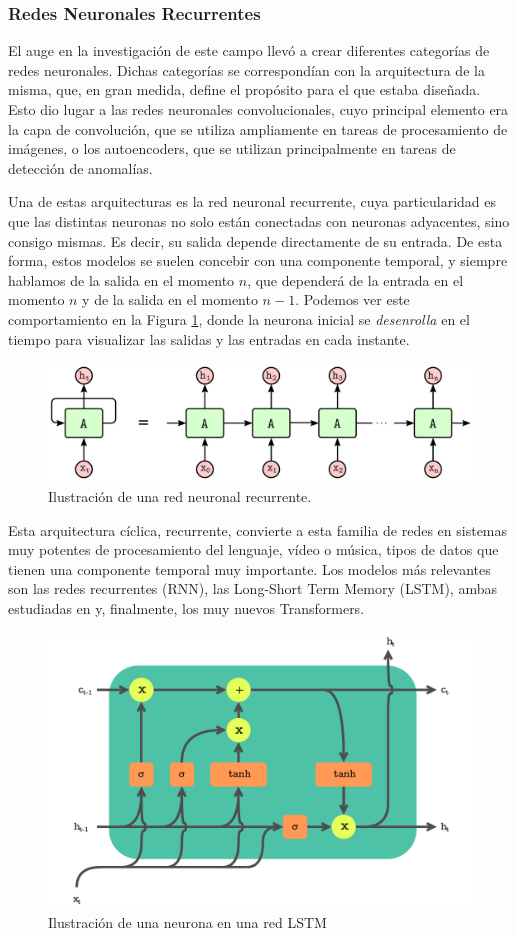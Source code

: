 \subsubsection{Redes Neuronales Recurrentes}
El auge en la investigación de este campo llevó a crear diferentes categorías de redes neuronales. Dichas categorías se correspondían con la arquitectura de la misma, que, en gran medida, define el propósito para el que estaba diseñada. Esto dio lugar a las redes neuronales convolucionales, cuyo principal elemento era la capa de convolución, que se utiliza ampliamente en tareas de procesamiento de imágenes, o los autoencoders, que se utilizan principalmente en tareas de detección de anomalías.

Una de estas arquitecturas es la red neuronal recurrente, cuya particularidad es que las distintas neuronas no solo están conectadas con neuronas adyacentes, sino consigo mismas. Es decir, su salida depende directamente de su entrada. De esta forma, estos modelos se suelen concebir con una componente temporal, y siempre hablamos de la salida en el momento $n$, que dependerá de la entrada en el momento $n$ y de la salida en el momento $n - 1$. Podemos ver este comportamiento en la Figura \ref{fig:rnn-unrolled}, donde la neurona inicial se \textit{desenrolla} en el tiempo para visualizar las salidas y las entradas en cada instante.


\begin{figure}[h]
    \centering
    \includegraphics[width=.9\textwidth]{media/rnn-graph.pdf}
    \caption{Ilustración de una red neuronal recurrente.}
    \label{fig:rnn-unrolled}
\end{figure}


Esta arquitectura cíclica, recurrente, convierte a esta familia de redes en sistemas muy potentes de procesamiento del lenguaje, vídeo o música, tipos de datos que tienen una componente temporal muy importante. Los modelos más relevantes son las redes recurrentes (RNN), las Long-Short Term Memory (LSTM), ambas estudiadas en \cite{sherstinsky2018fundamentals} y, finalmente, los muy nuevos Transformers.

\begin{figure}[h]
    \centering
    \includegraphics[width=.5\textwidth]{media/lstm-cell.pdf}
    \caption{Ilustración de una neurona en una red LSTM}
    \label{fig:lstm-cell}
\end{figure}

